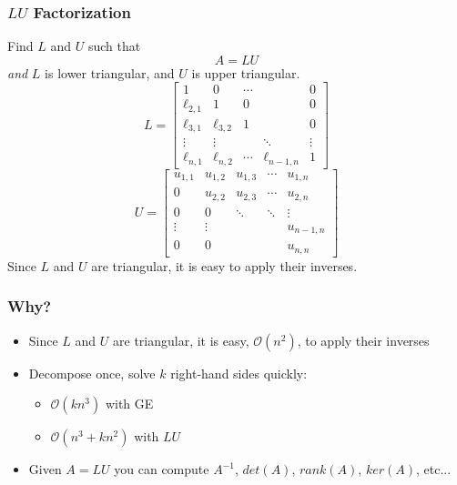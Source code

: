 \documentclass[10pt]{beamer}
\newcommand{\mO}{{\mathcal{O}}}
\begin{document}
\begin{frame}
\frametitle{$LU$ Factorization}

Find $L$ and $U$ such that
\begin{equation*}
    A = LU
\end{equation*}
\emph{and} $L$ is lower triangular, and $U$ is upper triangular.
\begin{equation*}
    L = \begin{bmatrix}   1       &     0      & \cdots &             & 0 \\
                       \ell_{2,1} &     1      &   0    &             & 0 \\
                       \ell_{3,1} & \ell_{3,2} &   1    &             & 0 \\
                          \vdots  &  \vdots    &        & \ddots      & \vdots  \\
                       \ell_{n,1} & \ell_{n,2} & \cdots & \ell_{n-1,n} & 1
        \end{bmatrix}
\end{equation*}
\begin{equation*}
    U = \begin{bmatrix} u_{1,1} & u_{1,2} & u_{1,3} & \cdots & u_{1,n} \\
                          0     & u_{2,2} & u_{2,3} & \cdots & u_{2,n} \\
                          0     &   0     & \ddots  & \ddots & \vdots \\
                         \vdots & \vdots  &         &        & u_{n-1,n} \\
                          0     &   0     &         &        & u_{n,n}
        \end{bmatrix}
\end{equation*}
Since $L$ and $U$ are triangular, it is easy to apply their inverses.

\end{frame}
\begin{frame}
\frametitle{Why?}
\begin{itemize}
    \item Since $L$ and $U$ are triangular, it is easy, $\mO(n^2)$, to apply their inverses
    \item Decompose once, solve $k$ right-hand sides quickly:
        \begin{itemize}
            \item $\mO(kn^3)$ with GE
            \item $\mO(n^3 + kn^2)$ with $LU$
        \end{itemize}
    \item  Given $A=LU$ you can compute $A^{-1}$, $det(A)$, $rank(A)$,
$ker(A)$, etc...
\end{itemize}


\end{frame}
\end{document}
